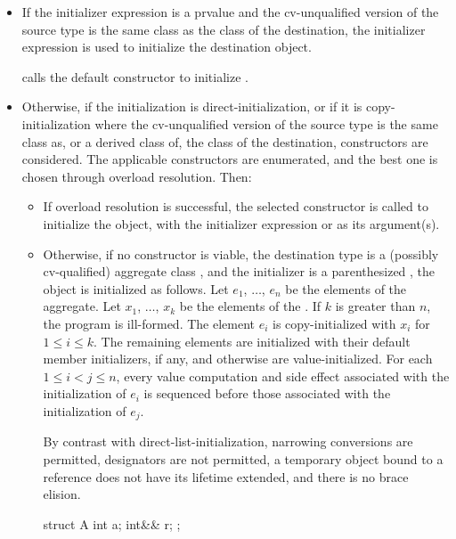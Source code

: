 \begin{itemize}
\begin{itemize}
\item
If the initializer expression is a prvalue
and the cv-unqualified version of the source type
is the same class as the class of the destination,
the initializer expression is used to initialize the destination object.
\begin{example}
 calls the  default constructor to initialize .
\end{example}
\item
Otherwise, if the initialization is direct-initialization,
or if it is copy-initialization where the cv-unqualified version of the source
type is the same class as, or a derived class of, the class of the destination,
constructors are considered.
The applicable constructors
are enumerated, and the best one is chosen
through overload resolution. Then:
\begin{itemize}
\item
If overload resolution is successful,
the selected constructor
is called to initialize the object, with the initializer
expression or  as its argument(s).
\item
Otherwise, if no constructor is viable,
the destination type is
a (possibly cv-qualified) aggregate class , and
the initializer is a parenthesized ,
the object is initialized as follows.
Let $e_1$, $\dotsc$, $e_n$ be the elements of the aggregate.
Let $x_1$, $\dotsc$, $x_k$ be the elements of the .
If $k$ is greater than $n$, the program is ill-formed.
The element $e_i$ is copy-initialized with
$x_i$ for $1 \leq i \leq k$.
The remaining elements are initialized with
their default member initializers, if any, and
otherwise are value-initialized.
For each $1 \leq i < j \leq n$,
every value computation and side effect
associated with the initialization of $e_i$
is sequenced before those associated with the initialization of $e_j$.
\begin{note}
By contrast with direct-list-initialization,
narrowing conversions are permitted,
designators are not permitted,
a temporary object bound to a reference
does not have its lifetime extended, and
there is no brace elision.
\begin{example}
\begin{codeblock}
struct A {
  int a;
  int&& r;
};


\end{codeblock}
\end{example}
\end{note}
\end{itemize}
\end{itemize}
\end{itemize}
